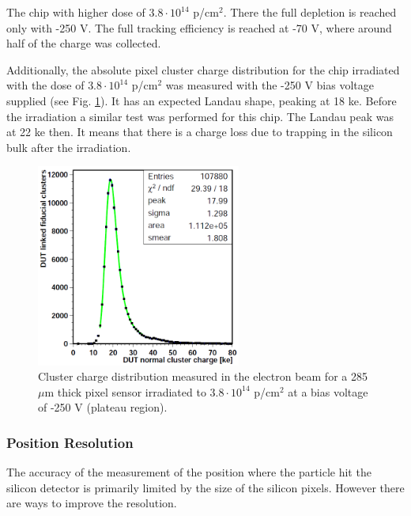 The chip with higher dose of $3.8 \cdot 10^{14}$ p/cm$^2$. There the full depletion is reached only with -250 V. The full tracking efficiency
is reached at -70 V, where around half of the charge was collected.

Additionally, the absolute pixel cluster charge distribution for the chip irradiated with the dose of $3.8 \cdot 10^{14}$ p/cm$^2$ was measured
with the -250 V bias voltage supplied (see Fig. \ref{fig:Landau}). It has an expected Landau shape, peaking at 18 ke. Before the irradiation a 
similar test was performed for this chip. The Landau peak was at 22 ke then. It means that there is a charge loss due to trapping in the silicon
bulk after the irradiation.

\begin{figure}[t]
 \centering
 \includegraphics[width=0.6\textwidth]{021_pixel_upgrade/plots/Landau.png}
 \caption{Cluster charge distribution measured in the electron beam for a 285$\mu$m thick pixel sensor irradiated to $3.8 \cdot 10^{14}$ p/cm$^2$ 
 at a bias voltage of -250 V (plateau region).}
 \label{fig:Landau}
\end{figure}

\subsubsection{Position Resolution}

The accuracy of the measurement of the position where the particle hit the silicon detector is primarily limited by the size of the silicon pixels.
However there are ways to improve the resolution. 